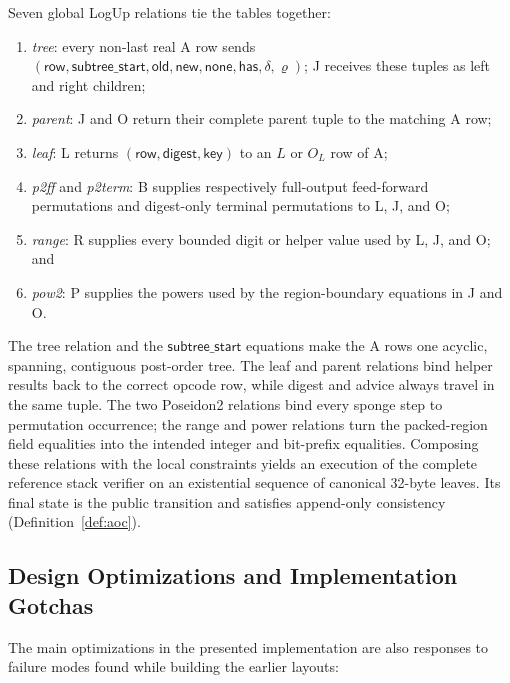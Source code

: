 \documentclass[twocolumn]{article}
\begin{document}
Seven global LogUp relations tie the tables together:
\begin{enumerate}[nosep]
    \item \emph{tree}: every non-last real A row sends $(\mathsf{row},\mathsf{subtree\_start},\mathsf{old},\mathsf{new},\mathsf{none},\mathsf{has},\delta,\varrho)$; J receives these tuples as left and right children;
    \item \emph{parent}: J and O return their complete parent tuple to the matching A row;
    \item \emph{leaf}: L returns $(\mathsf{row},\mathsf{digest},\mathsf{key})$ to an $L$ or $O_L$ row of A;
    \item \emph{p2ff} and \emph{p2term}: B supplies respectively full-output feed-forward permutations and digest-only terminal permutations to L, J, and O;
    \item \emph{range}: R supplies every bounded digit or helper value used by L, J, and O; and
    \item \emph{pow2}: P supplies the powers used by the region-boundary equations in J and O.
\end{enumerate}

The tree relation and the $\mathsf{subtree\_start}$ equations make the A rows one acyclic, spanning, contiguous post-order tree. The leaf and parent relations bind helper results back to the correct opcode row, while digest and advice always travel in the same tuple. The two Poseidon2 relations bind every sponge step to permutation occurrence; the range and power relations turn the packed-region field equalities into the intended integer and bit-prefix equalities. Composing these relations with the local constraints yields an execution of the complete reference stack verifier on an existential sequence of canonical 32-byte leaves. Its final state is the public transition and satisfies append-only consistency (Definition~\ref{def:aoc}).

\subsection{Design Optimizations and Implementation Gotchas}

The main optimizations in the presented implementation are also responses to failure modes found while building the earlier layouts:
\end{document}
